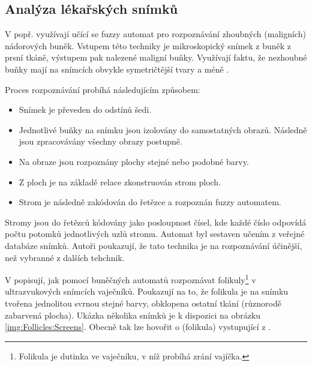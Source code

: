 \documentclass[a4paper,10pt]{article}
\begin{document}


\subsection{Analýza lékařských snímků}
V \cite{Est+-CytImAnaGenFuFiStMa} popř. \cite{Est+-CytImAnaGenFuFiStMa} využívají učící se fuzzy automat pro rozpoznávání zhoubných (maligních) nádorových buněk. Vstupem této techniky je mikroskopický snímek z buněk z prsní tkáně, výstupem pak nalezené maligní buňky. Využívají faktu, že nezhoubné buňky mají na snímcích obvykle symetričtější tvary a méně .

Proces rozpoznávání probíhá následujícím způsobem:
\begin{itemize}
 \item Snímek je převeden do odstínů šedi.
 \item Jednotlivé buňky na snímku jsou izolovány do samostatných obrazů. Následně jsou zpracovávány všechny obrazy postupně.
 \item Na obraze jsou rozpoznány plochy stejné nebo podobné barvy.
 \item Z ploch je na základě relace  zkonstruován strom ploch.
 \item Strom je následně zakódován do řetězce a rozpoznán fuzzy automatem.
\end{itemize}

Stromy jsou do řetězců kódovány jako posloupnost čísel, kde každé číslo odpovídá počtu potomků jednotlivých uzlů stromu. Automat byl sestaven učením z veřejné databáze snímků. Autoři poukazují, že tato technika je na rozpoznávání účinější, než vybranné z dalších tehchnik.


V \cite{WanJiaZhoDu-ImProcBasFuzCelAuMod} popisují, jak pomocí buněčných automatů rozpoznávat folikuly\footnote{Folikula je dutinka ve vaječníku, v níž probíhá zrání vajíčka. } v ultrazvukových snímcích vaječníků. Poukazují na to, že folikula je na snímku tvořena jednolitou svrnou stejné barvy, obklopena ostatní tkání (různorodě zabarvená plocha). Ukázka několika snímků je k dispozici na obrázku \ref{img:Follicles:Screens}. Obecně tak lze hovořit o  (folikula) vystupující z .
\end{document}
